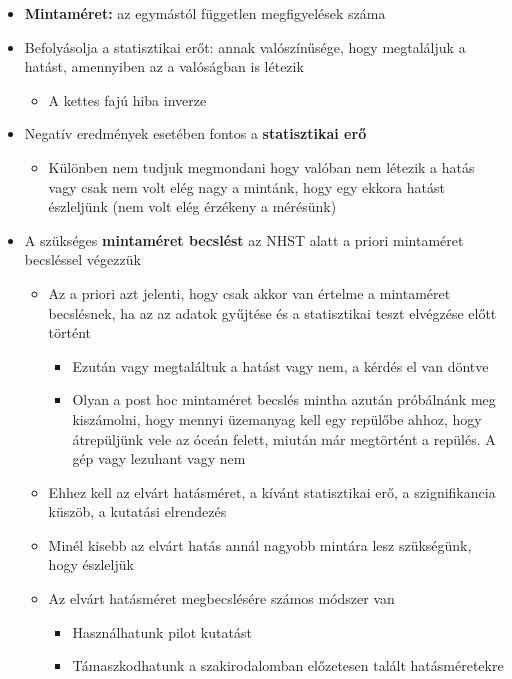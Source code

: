 \documentclass[
  letterpaper,
  DIV=11,
  numbers=noendperiod]{scrreprt}
\providecommand{\tightlist}{%
  \setlength{\itemsep}{0pt}\setlength{\parskip}{0pt}}\usepackage{longtable,booktabs,array}
\begin{document}
\begin{itemize}
\item
  \textbf{Mintaméret:} az egymástól független megfigyelések száma
\item
  Befolyásolja a statisztikai erőt: annak valószínűsége, hogy
  megtaláljuk a hatást, amennyiben az a valóságban is létezik

  \begin{itemize}
  \tightlist
  \item
    A kettes fajú hiba inverze
  \end{itemize}
\item
  Negatív eredmények esetében fontos a \textbf{statisztikai erő}

  \begin{itemize}
  \tightlist
  \item
    Különben nem tudjuk megmondani hogy valóban nem létezik a hatás vagy
    csak nem volt elég nagy a mintánk, hogy egy ekkora hatást észleljünk
    (nem volt elég érzékeny a mérésünk)
  \end{itemize}
\item
  A szükséges \textbf{mintaméret becslést} az NHST alatt a priori
  mintaméret becsléssel végezzük

  \begin{itemize}
  \item
    Az a priori azt jelenti, hogy csak akkor van értelme a mintaméret
    becslésnek, ha az az adatok gyűjtése és a statisztikai teszt
    elvégzése előtt történt

    \begin{itemize}
    \item
      Ezután vagy megtaláltuk a hatást vagy nem, a kérdés el van döntve
    \item
      Olyan a post hoc mintaméret becslés mintha azután próbálnánk meg
      kiszámolni, hogy mennyi üzemanyag kell egy repülőbe ahhoz, hogy
      átrepüljünk vele az óceán felett, miután már megtörtént a repülés.
      A gép vagy lezuhant vagy nem
    \end{itemize}
  \item
    Ehhez kell az elvárt hatásméret, a kívánt statisztikai erő, a
    szignifikancia küszöb, a kutatási elrendezés
  \item
    Minél kisebb az elvárt hatás annál nagyobb mintára lesz szükségünk,
    hogy észleljük
  \item
    Az elvárt hatásméret megbecslésére számos módszer van

    \begin{itemize}
    \item
      Használhatunk pilot kutatást
    \item
      Támaszkodhatunk a szakirodalomban előzetesen talált hatásméretekre


\end{itemize}
\end{itemize}
\end{itemize}
\end{document}
